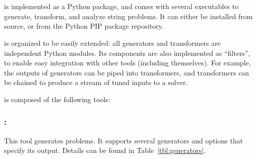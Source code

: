 \section{\fuzzer{}}
\label{sec:fuzzer}


    \fuzzer{} is implemented as a Python package, and comes with several executables to generate, transform, and analyze \smtfull{} string problems. It can either be installed from source, or from the Python PIP package repository. 
    

    \fuzzer{} is organized to be easily extended: all generators and transformers are independent Python modules. Its components are also implemented as \unix{} ``filters'', to enable easy integration with other tools (including themselves). For example, the outputs of generators can be piped into transformers, and transformers can be chained to produce a stream of tuned inputs to a solver. 
    
    \fuzzer{} is composed of the following tools:



\subsubsection{\generator{}:}


This tool generates \smt{} problems. It supports several generators and options that specify its output. Details can be found in Table~\ref{tbl:generators}.
    
    
    
